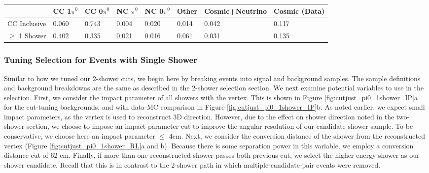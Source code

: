 \begin{table}[H]
\centering
{}
 \begin{tabular}{| l | l | l |l|l|l|l|l|}
 \hline
 & CC 1$\pi^0$ & CC 0$\pi^0$ & NC $\pi^0$ & NC 0$\pi^0$ & Other & Cosmic+Neutrino & Cosmic (Data) \\ [0.1ex] \hline
CC Inclusive & 0.060 & 0.743 & 0.004 & 0.020 & 0.014 & 0.042 & 0.117 \\
$\geq$ 1 Shower & 0.402 & 0.335 & 0.021 & 0.016 & 0.061 & 0.031 & 0.135\\ \hline
\end{tabular}
\end{table}

\subsubsection{Tuning Selection for Events with Single Shower}

Similar to how we tuned our 2-shower cuts, we begin here by breaking events into signal and background samples.  The sample definitions and background breakdowns are the same as described in the 2-shower selection section.  We next examine potential variables to use in the selection.  First, we consider the impact parameter of all showers with the vertex.  This is shown in Figure \ref{fig:cutjust_pi0_1shower_IP}a for the cut-tuning backgrounds, and with data-MC comparison in Figure \ref{fig:cutjust_pi0_1shower_IP}b. As noted earlier, we expect small impact parameters, as the vertex is used to reconstruct 3D direction. However, due to the effect on shower direction noted in the two-shower section, we choose to impose an impact parameter cut to improve the angular resolution of our candidate shower sample. To be conservative, we choose here an impact parameter $\leq$ 4cm. Next, we consider the conversion distance of the shower from the reconstructed vertex (Figure \ref{fig:cutjust_pi0_1shower_RL}a and b). Because there is some separation power in this variable, we employ a conversion distance cut of 62 cm.  Finally, if more than one reconstructed shower passes both previous cut, we select the higher energy shower as our shower candidate.  Recall that this is in contrast to the 2-shower path in which multiple-candidate-pair events were removed.

